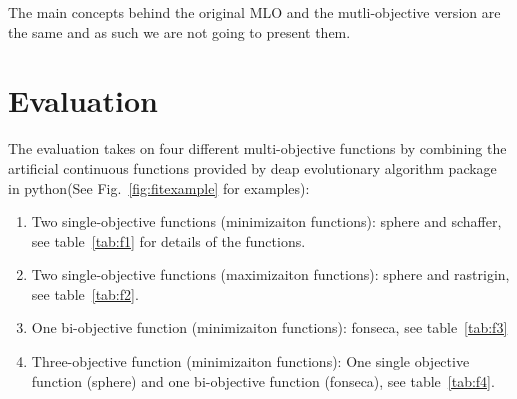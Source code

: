 \documentclass[11pt, runningheads,a4paper]{llncs}
\begin{document}
The main concepts behind the original MLO and the mutli-objective version are the same and as such we are not going to present them.

\section{Evaluation}
\label{evaluation}

The evaluation takes on four different  multi-objective functions by combining the artificial continuous functions provided by deap evolutionary algorithm package in python(See Fig.~\ref{fig:fitexample} for examples):
\begin{enumerate}\addtolength{\itemsep}{0.2\baselineskip}  
\item Two single-objective functions (minimizaiton functions): sphere and schaffer, see table~\ref{tab:f1} for details of the functions.
\item Two single-objective functions (maximizaiton functions): sphere and rastrigin, see table~\ref{tab:f2}.
\item One bi-objective function (minimizaiton functions):  fonseca, see table~\ref{tab:f3}
\item Three-objective function (minimizaiton functions): One single objective function (sphere) and one bi-objective function (fonseca), see table~\ref{tab:f4}.
\end{enumerate}
\end{document}
